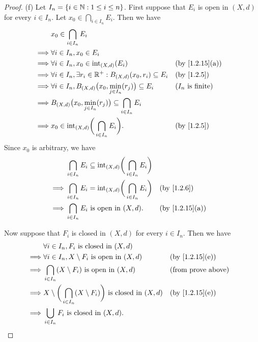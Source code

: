 \begin{proof}{(f)}
  Let \(I_n = \{i \in \mathbb{N} : 1 \leq i \leq n\}\).
  First suppose that \(E_i\) is open in \((X, d)\) for every \(i \in I_n\).
  Let \(x_0 \in \bigcap_{i \in I_n} E_i\).
  Then we have
  \begin{align*}
             & x_0 \in \bigcap_{i \in I_n} E_i                                                                                    \\
    \implies & \forall i \in I_n, x_0 \in E_i                                                                                     \\
    \implies & \forall i \in I_n, x_0 \in \text{int}_{(X, d)}(E_i)                              &  & \text{(by \cref{1.2.15}(a))} \\
    \implies & \forall i \in I_n, \exists r_i \in \R^+ : B_{(X, d)}(x_0, r_i) \subseteq E_i     &  & \by{1.2.5}                   \\
    \implies & \forall i \in I_n, B_{(X, d)}\big(x_0, \min_{j \in I_n}(r_j)\big) \subseteq E_i  &  & \text{(\(I_n\) is finite)}   \\
    \implies & B_{(X, d)}\big(x_0, \min_{j \in I_n}(r_j)\big) \subseteq \bigcap_{i \in I_n} E_i                                   \\
    \implies & x_0 \in \text{int}_{(X, d)}\bigg(\bigcap_{i \in I_n} E_i\bigg).                  &  & \by{1.2.5}
  \end{align*}
  Since \(x_0\) is arbitrary, we have
  \begin{align*}
             & \bigcap_{i \in I_n} E_i \subseteq \text{int}_{(X, d)}\bigg(\bigcap_{i \in I_n} E_i\bigg)                                   \\
    \implies & \bigcap_{i \in I_n} E_i = \text{int}_{(X, d)}\bigg(\bigcap_{i \in I_n} E_i\bigg)         &  & \by{1.2.6}                   \\
    \implies & \bigcap_{i \in I_n} E_i \text{ is open in } (X, d).                                      &  & \text{(by \cref{1.2.15}(a))}
  \end{align*}

  Now suppose that \(F_i\) is closed in \((X, d)\) for every \(i \in I_n\).
  Then we have
  \begin{align*}
             & \forall i \in I_n, F_i \text{ is closed in } (X, d)                                                                          \\
    \implies & \forall i \in I_n, X \setminus F_i \text{ is open in } (X, d)                              &  & \text{(by \cref{1.2.15}(e))} \\
    \implies & \bigcap_{i \in I_n} (X \setminus F_i) \text{ is open in } (X, d)                           &  & \text{(from prove above)}    \\
    \implies & X \setminus \bigg(\bigcap_{i \in I_n} (X \setminus F_i)\bigg) \text{ is closed in } (X, d) &  & \text{(by \cref{1.2.15}(e))} \\
    \implies & \bigcup_{i \in I_n} F_i \text{ is closed in } (X, d).
  \end{align*}
\end{proof}

